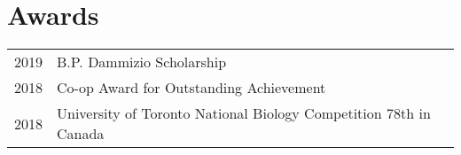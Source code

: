 \documentclass[]{chandan-cv}
\begin{document}
\begin{minipage}[t]{0.73\textwidth}

\section{Awards}
\begin{tabular}{rll}
2019		&	B.P. Dammizio Scholarship\\
2018		&	Co-op Award for Outstanding Achievement\\
2018		&	University of Toronto National Biology Competition 78th in Canada\\
\end{tabular}
\sectionsep

%
%

\end{minipage}
\end{document}
